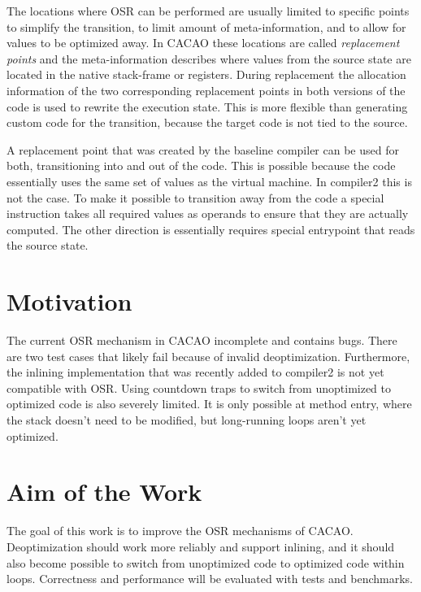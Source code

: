 \documentclass[draft,final]{vutinfth} %
\begin{document}
    The locations where OSR can be performed are usually limited to specific points
    to simplify the transition, to limit amount of meta-information, and to allow for values to be optimized away.
    In CACAO these locations are called \emph{replacement points}
    and the meta-information describes where values
    from the source state are located in the native stack-frame or registers.
    During replacement the allocation information of the two corresponding replacement points
    in both versions of the code is used to rewrite the execution state.
    This is more flexible than generating custom code for the transition,
    because the target code is not tied to the source.

    A replacement point that was created by the baseline compiler can be used for both,
    transitioning into and out of the code.
    This is possible because the code essentially uses the same set of values as the virtual machine.
    In compiler2 this is not the case.
    To make it possible to transition away from the code a special instruction takes all required values as operands to ensure that they are actually computed.
    The other direction is essentially requires special entrypoint that reads the source state.


    \section{Motivation}

    The current OSR mechanism in CACAO incomplete and contains bugs.
    There are two test cases that likely fail because of invalid deoptimization.
    Furthermore, the inlining implementation\cite{MethodInlining} that was recently added to compiler2 is not yet compatible with OSR.
    Using countdown traps to switch from unoptimized to optimized code is also severely limited.
    It is only possible at method entry, where the stack doesn't need to be modified,
    but long-running loops aren't yet optimized.


    \section{Aim of the Work}

    The goal of this work is to improve the OSR mechanisms of CACAO.
    Deoptimization should work more reliably and support inlining,
    and it should also become possible to switch from unoptimized code to optimized code within loops.
    Correctness and performance will be evaluated with tests and benchmarks.
\end{document}
